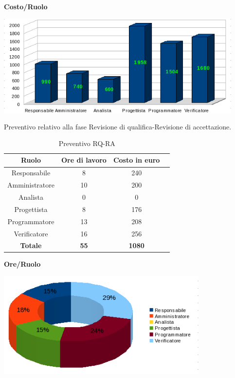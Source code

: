 \begin{center}\textbf{Costo/Ruolo}
\end{center}
\includegraphics[width=350pt]{RPP_RQ_Costi}

\newpage

Preventivo relativo alla fase Revisione di qualifica-Revisione di accettazione.
\begin{table}[h]
	\begin{center}
		  \begin{tabular}{|c|c|c|c|}
		 \hline 
		 \textbf{Ruolo} & \textbf{Ore di lavoro} & \textbf{Costo in euro}\\
		 \hline
		Responsabile & 8 & 240 \\
		Amministratore & 10 & 200\\
		Analista & 0 & 0\\
		Progettista & 8 & 176\\
		Programmatore & 13 & 208 \\
		Verificatore & 16 & 256\\
        \hline
        \textbf{Totale} & \textbf{55} & \textbf{1080}\\
		\hline
		\end{tabular}
	\caption{Preventivo RQ-RA} 
	\label{tab:tabella_RQ-RA}
	\end{center}	
\end{table}



\begin{center}\textbf{Ore/Ruolo}
\end{center}
\includegraphics[width=300pt]{RQ_RA_Ore}

